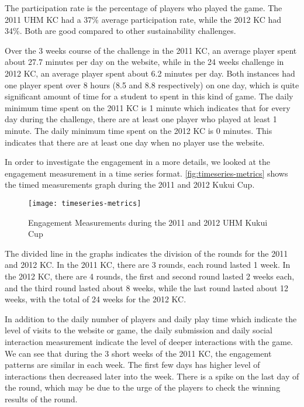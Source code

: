 The participation rate is the percentage of players who played the game. The 2011 UHM KC had a 37\% average participation rate, while the 2012 KC had 34\%. Both are good compared to other sustainability challenges. 

Over the 3 weeks course of the challenge in the 2011 KC, an average player spent about 27.7 minutes per day on the website, while in the 24 weeks challenge in 2012 KC, an average player spent about 6.2 minutes per day. Both instances had one player spent over 8 hours (8.5 and 8.8 respectively) on one day, which is quite significant amount of time for a student to spent in this kind of game. The daily minimum time spent on the 2011 KC is 1 minute which indicates that for every day during the challenge, there are at least one player who played at least 1 minute. The daily minimum time spent on the 2012 KC is 0 minutes. This indicates that there are at least one day when no player use the website.

In order to investigate the engagement in a more details, we looked at the engagement measurement in a time series format. \autoref{fig:timeseries-metrics} shows the timed measurements graph during the 2011 and 2012 Kukui Cup.

\begin{figure}[ht!]
  \center
  \texttt{[image: timeseries-metrics]}
  \caption{Engagement Measurements during the 2011 and 2012 UHM Kukui Cup}
  \label{fig:timeseries-metrics}
\end{figure}

The divided line in the graphs indicates the division of the rounds for the 2011 and 2012 KC. In the 2011 KC, there are 3 rounds, each round lasted 1 week. In the 2012 KC, there are 4 rounds, the first and second round lasted 2 weeks each, and the third round lasted about 8 weeks, while the last round lasted about 12 weeks, with the total of 24 weeks for the 2012 KC. 

In addition to the daily number of players and daily play time which indicate the level of visits to the website or game, the daily submission and daily social interaction measurement indicate the level of deeper interactions with the game. We can see that during the 3 short weeks of the 2011 KC, the engagement patterns are similar in each week. The first few days has higher level of interactions then decreased later into the week. There is a spike on the last day of the round, which may be due to the urge of the players to check the winning results of the round. 

